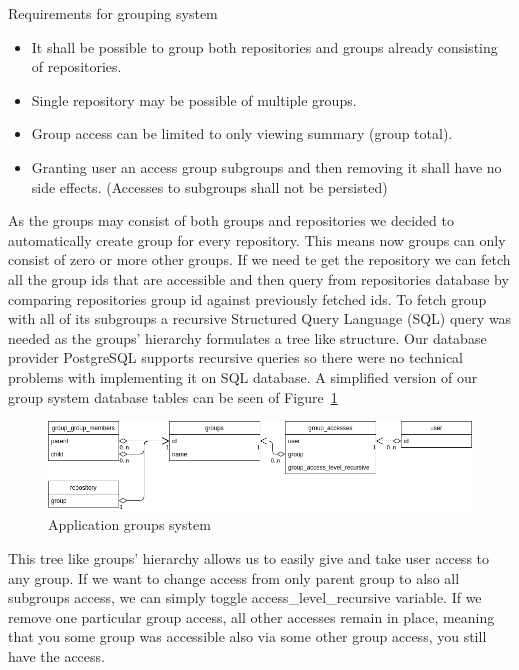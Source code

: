 Requirements for grouping system
\begin{itemize}
    \item It shall be possible to group both repositories and groups already consisting of repositories.
    \item Single repository may be possible of multiple groups.
    \item Group access can be limited to only viewing summary (group total).
    \item Granting user an access group subgroups and then removing it shall have no side effects. (Accesses to subgroups shall not be persisted)
\end{itemize}

As the groups may consist of both groups and repositories we decided to automatically create group for every repository.
This means now groups can only consist of zero or more other groups.
If we need te get the repository we can fetch all the group ids that are accessible and then query from repositories database by
comparing repositories group id against previously fetched ids.
To fetch group with all of its subgroups a recursive Structured Query Language (SQL) query was needed as the groups'
hierarchy formulates a tree like structure.
Our database provider PostgreSQL supports recursive queries so there were no technical problems with implementing it on SQL database.
A simplified version of our group system database tables can be seen of Figure~\ref{fig:group-system}

\begin{figure}[h]
    \includegraphics[width=\textwidth]{figures/group_system}
    \caption{Application groups system}
    \label{fig:group-system}
\end{figure}

This tree like groups' hierarchy allows us to easily give and take user access to any group.
If we want to change access from only parent group to also all subgroups access, we can simply toggle access{\_}level{\_}recursive
variable.
If we remove one particular group access, all other accesses remain in place, meaning that you some group was accessible
also via some other group access, you still have the access.

